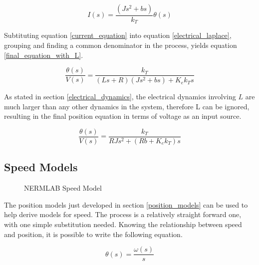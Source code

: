 \begin{equation}
\label{current equation}
I(s) = \frac{(Js^2 + bs)}{k_T}\theta(s)
\end{equation}

Subtituting equation \ref{current_equation} into equation \ref{electrical_laplace}, grouping and finding a common denominator in the process, yields equation \ref{final_equation_with_L}.

\begin{equation}
\label{final_equation_with_L}
\frac{\theta(s)}{V(s)} = \frac{k_T}{(Ls+R)(Js^2 + bs) + K_ek_Ts}
\end{equation}

As stated in section \ref{electrical_dynamics}, the electrical dynamics involving $L$ are much larger than any other dynamics in the system, therefore L can be ignored, resulting in the final position equation in terms of voltage as an input source.

\begin{equation}
\label{position_equation_voltage}
\frac{\theta(s)}{V(s)} = \frac{k_T}{RJs^2 + (Rb + K_ek_T)s}
\end{equation}

\subsection{Speed Models}
\label{speed_models}

\begin{figure}[H]
	\begin{center}
		\caption[NERMLAB Speed Model]{NERMLAB Speed Model}
		\label{model_speed_chp4}
		
	\end{center}
\end{figure}

The position models just developed in section \ref{position_models} can be used to help derive models for speed. The process is a relatively straight forward one, with one simple substitution needed. Knowing the relationship between speed and position, it is possible to write the following equation.

\begin{equation}
\label{theta_speed_rel}
\theta(s) = \frac{\omega(s)}{s}
\end{equation}

